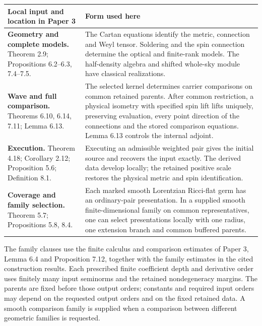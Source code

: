 \documentclass[
  english,
  11pt,
  reqno]{amsart}
\newcounter{none} %
\begin{document}
{\def\LTcaptype{none} %
\par\medskip\noindent\begin{tabular}{@{}>{\raggedright\arraybackslash}p{.31\linewidth}@{\hspace{.035\linewidth}}>{\raggedright\arraybackslash}p{.655\linewidth}@{}}
\toprule\noalign{}
\begin{minipage}[b]{\linewidth}\raggedright
Local input and location in Paper 3
\end{minipage} & \begin{minipage}[b]{\linewidth}\raggedright
Form used here
\end{minipage} \\
\midrule\noalign{}
\textbf{Geometry and complete models.} Theorem 2.9; Propositions
6.2--6.3, 7.4--7.5. & The Cartan equations identify the metric,
connection and Weyl tensor. Soldering and the spin connection determine
the optical and finite-rank models. The half-density algebra and shifted
whole-sky module have classical realizations. \\
\addlinespace[.4em]
\textbf{Wave and full comparison.} Theorems 6.10, 6.14, 7.11; Lemma
6.13. & The selected kernel determines carrier comparisons on common
retained parents. After common restriction, a physical isometry with
specified spin lift lifts uniquely, preserving evaluation, every point
direction of the connections and the stored comparison equations. Lemma
6.13 controls the internal adjoint. \\
\addlinespace[.4em]
\textbf{Execution.} Theorem 4.18; Corollary 2.12; Proposition 5.6;
Definition 8.1. & Executing an admissible weighted pair gives the
initial source and recovers the input exactly. The derived data develop
locally; the retained positive scale restores the physical metric and
spin identification. \\
\addlinespace[.4em]
\textbf{Coverage and family selection.} Theorem 5.7; Propositions 5.8,
8.4. & Each marked smooth Lorentzian Ricci-flat germ has an
ordinary-pair presentation. In a supplied smooth finite-dimensional
family on common representatives, one can select presentations locally
with one radius, one extension branch and common buffered parents.  \\
\bottomrule\end{tabular}\par\medskip
}

The family clauses use the finite calculus and comparison estimates of
Paper 3, Lemma 6.4 and Proposition 7.12, together with the family
estimates in the cited construction results. Each prescribed finite
coefficient depth and derivative order uses finitely many input
seminorms and the retained nondegeneracy margins. The parents are fixed
before those output orders; constants and required input orders may
depend on the requested output orders and on the fixed retained data. A
smooth comparison family is supplied when a comparison between different
geometric families is requested.
\end{document}
